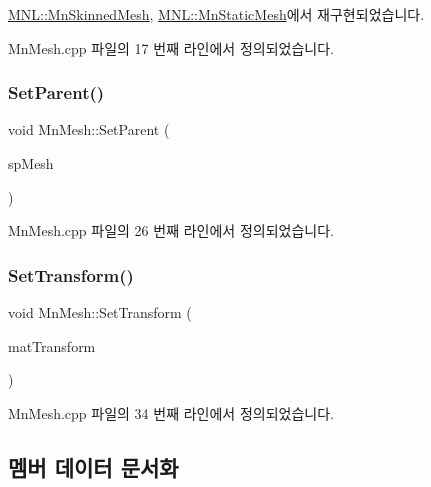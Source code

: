 \hyperlink{class_m_n_l_1_1_mn_skinned_mesh_ad212179142cda2c4a722b58ab19a739e}{M\+N\+L\+::\+Mn\+Skinned\+Mesh}, \hyperlink{class_m_n_l_1_1_mn_static_mesh_a0593293ce8d641b9573239828b8dc31b}{M\+N\+L\+::\+Mn\+Static\+Mesh}에서 재구현되었습니다.



Mn\+Mesh.\+cpp 파일의 17 번째 라인에서 정의되었습니다.

\mbox{\label{class_m_n_l_1_1_mn_mesh_a05cb7889b4f8ce6ed32334082ea9ac4c}} 
\subsubsection{\texorpdfstring{Set\+Parent()}{SetParent()}}
{\footnotesize\ttfamily void Mn\+Mesh\+::\+Set\+Parent (\begin{DoxyParamCaption}\item[{const std\+::shared\+\_\+ptr$<$ \hyperlink{class_m_n_l_1_1_mn_mesh}{Mn\+Mesh} $>$ \&}]{sp\+Mesh }\end{DoxyParamCaption})}



Mn\+Mesh.\+cpp 파일의 26 번째 라인에서 정의되었습니다.

\mbox{\label{class_m_n_l_1_1_mn_mesh_a47ce5880e4d73b11887c83921824f43d}} 
\subsubsection{\texorpdfstring{Set\+Transform()}{SetTransform()}}
{\footnotesize\ttfamily void Mn\+Mesh\+::\+Set\+Transform (\begin{DoxyParamCaption}\item[{const Direct\+X\+::\+Simple\+Math\+::\+Matrix \&}]{mat\+Transform }\end{DoxyParamCaption})}



Mn\+Mesh.\+cpp 파일의 34 번째 라인에서 정의되었습니다.



\subsection{멤버 데이터 문서화}
\mbox{\label{class_m_n_l_1_1_mn_mesh_a3617de4ff06fb44e929375c976749e39}} 
